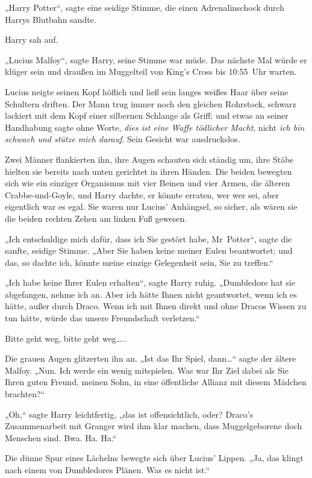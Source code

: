 {„Harry Potter“, sagte eine seidige Stimme, die einen Adrenalinschock durch Harrys Blutbahn sandte.

Harry sah auf.

„Lucius Malfoy“, sagte Harry, seine Stimme war müde. Das nächste Mal würde er klüger sein und draußen im Muggelteil von King's Cross bis 10:55~Uhr warten.

Lucius neigte seinen Kopf höflich und ließ sein langes weißes Haar über seine Schultern driften. Der Mann trug immer noch den gleichen Rohrstock, schwarz lackiert mit dem Kopf einer silbernen Schlange als Griff; und etwas an seiner Handhabung sagte ohne Worte, \emph{dies ist eine Waffe tödlicher Macht}, nicht \emph{ich bin schwach und stütze mich darauf}. Sein Gesicht war ausdruckslos.

Zwei Männer flankierten ihn, ihre Augen schauten sich ständig um, ihre Stäbe hielten sie bereits nach unten gerichtet in ihren Händen. Die beiden bewegten sich wie ein einziger Organismus mit vier Beinen und vier Armen, die älteren Crabbe-und-Goyle, und Harry dachte, er könnte erraten, wer wer sei, aber eigentlich war es egal. Sie waren nur Lucius' Anhängsel, so sicher, als wären sie die beiden rechten Zehen am linken Fuß gewesen.

„Ich entschuldige mich dafür, dass ich Sie gestört habe, Mr~Potter“, sagte die sanfte, seidige Stimme. „Aber Sie haben keine meiner Eulen beantwortet; und das, so dachte ich, könnte meine einzige Gelegenheit sein, Sie zu treffen.“

„Ich habe keine Ihrer Eulen erhalten“, sagte Harry ruhig. „Dumbledore hat sie abgefangen, nehme ich an. Aber ich hätte Ihnen nicht geantwortet, wenn ich es hätte, außer durch Draco. Wenn ich mit Ihnen direkt und ohne Dracos Wissen zu tun hätte, würde das unsere Freundschaft verletzen.“

Bitte geht weg, bitte geht weg…..

Die grauen Augen glitzerten ihn an. „Ist das Ihr Spiel, dann…“ sagte der ältere Malfoy. „Nun. Ich werde ein wenig mitspielen. Was war Ihr Ziel dabei als Sie Ihren guten Freund, meinen Sohn, in eine öffentliche Allianz mit diesem Mädchen brachten?“

„Oh,“ sagte Harry leichtfertig, „das ist offensichtlich, oder? Draco's Zusammenarbeit mit Granger wird ihm klar machen, dass Muggelgeborene doch Menschen sind. Bwa. Ha. Ha.“

Die dünne Spur eines Lächelns bewegte sich über Lucius' Lippen. „Ja, das klingt nach einem von Dumbledores Plänen. Was es nicht ist.“

}
